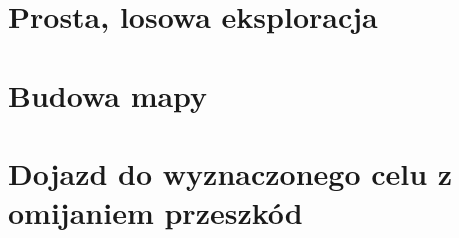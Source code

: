 \section{Prosta, losowa eksploracja}

\section{Budowa mapy}

\section{Dojazd do wyznaczonego celu z omijaniem przeszkód}
